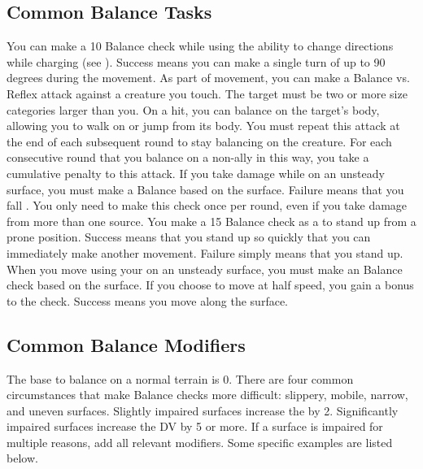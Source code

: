   \subsection{Common Balance Tasks}
     You can make a  10 Balance check while using the  ability to change directions while charging (see ).
    Success means you can make a single turn of up to 90 degrees during the movement.
     As part of movement, you can make a Balance vs. Reflex attack against a creature you touch.
    The target must be two or more size categories larger than you.
    On a hit, you can balance on the target's body, allowing you to walk on or jump from its body.
    You must repeat this attack at the end of each subsequent round to stay balancing on the creature.
    For each consecutive round that you balance on a non-ally in this way, you take a cumulative  penalty to this attack.
     If you take damage while on an unsteady surface, you must make a Balance  based on the surface.
    Failure means that you fall \prone.
    You only need to make this check once per round, even if you take damage from more than one source.
     You make a  15 Balance check as a  to stand up from a prone position.
    Success means that you stand up so quickly that you can immediately make another movement.
    Failure simply means that you stand up.
     When you move using your  on an unsteady surface, you must make an Balance check based on the surface.
    If you choose to move at half speed, you gain a  bonus to the check.
    Success means you move along the surface.

  \subsection{Common Balance Modifiers}

    The base  to balance on a normal terrain is 0.
    There are four common circumstances that make Balance checks more difficult: slippery, mobile, narrow, and uneven surfaces.
    Slightly impaired surfaces increase the  by 2.
    Significantly impaired surfaces increase the DV by 5 or more.
    If a surface is impaired for multiple reasons, add all relevant modifiers.
    Some specific examples are listed below.

